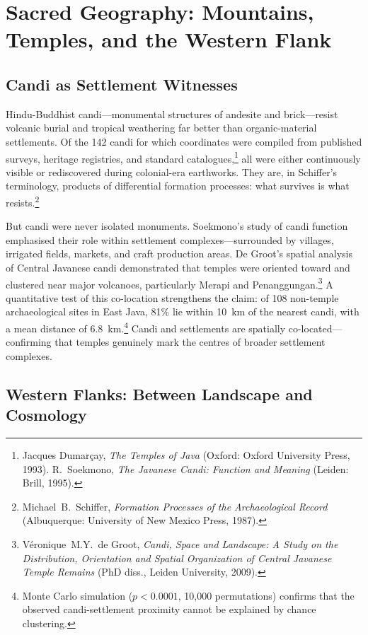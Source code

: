 \documentclass[12pt,a4paper]{article}
\begin{document}
\section{Sacred Geography: Mountains, Temples, and the Western Flank}

\subsection{Candi as Settlement Witnesses}

Hindu-Buddhist candi---monumental structures of andesite and brick---resist volcanic burial and tropical weathering far better than organic-material settlements.
Of the 142 candi for which coordinates were compiled from published surveys, heritage registries, and standard catalogues,\footnote{Jacques Dumar\c{c}ay, \emph{The Temples of Java} (Oxford: Oxford University Press, 1993). R.\ Soekmono, \emph{The Javanese Candi: Function and Meaning} (Leiden: Brill, 1995).} all were either continuously visible or rediscovered during colonial-era earthworks.
They are, in Schiffer's terminology, products of differential formation processes: what survives is what resists.\footnote{Michael~B.\ Schiffer, \emph{Formation Processes of the Archaeological Record} (Albuquerque: University of New Mexico Press, 1987).}

But candi were never isolated monuments.
Soekmono's study of candi function emphasised their role within settlement complexes---surrounded by villages, irrigated fields, markets, and craft production areas.
De Groot's spatial analysis of Central Javanese candi demonstrated that temples were oriented toward and clustered near major volcanoes, particularly Merapi and Penanggungan.\footnote{V\'{e}ronique~M.Y.\ de Groot, \emph{Candi, Space and Landscape: A Study on the Distribution, Orientation and Spatial Organization of Central Javanese Temple Remains} (PhD diss., Leiden University, 2009).}
A quantitative test of this co-location strengthens the claim: of 108 non-temple archaeological sites in East Java, 81\% lie within 10~km of the nearest candi, with a mean distance of 6.8~km.\footnote{Monte Carlo simulation ($p < 0.0001$, 10,000 permutations) confirms that the observed candi-settlement proximity cannot be explained by chance clustering.}
Candi and settlements are spatially co-located---confirming that temples genuinely mark the centres of broader settlement complexes.

\subsection{Western Flanks: Between Landscape and Cosmology}
\end{document}
